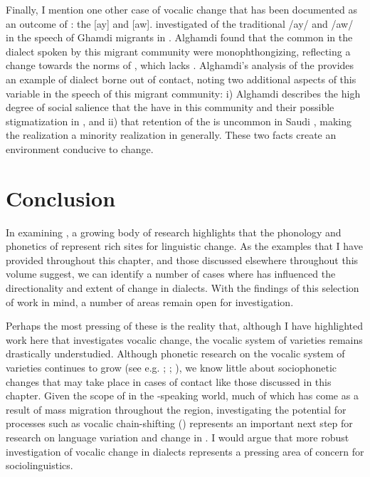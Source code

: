 \documentclass[output=paper]{langsci/langscibook}
\begin{document}
  Finally, I mention one other case of vocalic change that has been documented as an outcome of : the  [ay] and [aw]. \citet{Alghamdi2014} investigated  of the traditional   /ay/ and /aw/ in the speech of {Ghamdi} migrants in . Alghamdi found that the  common in the dialect spoken by this migrant community were monophthongizing, reflecting a change towards the norms of  , which lacks . Alghamdi’s analysis of the  provides an example of dialect  borne out of contact, noting two additional aspects of this variable in the speech of this migrant community: i) Alghamdi describes the high degree of social salience that the  have in this community and their possible stigmatization in , and ii) that retention of the  is uncommon in Saudi , making the  realization a minority realization in  generally. These two facts create an environment conducive to change.

\section{Conclusion}

In examining  , a growing body of research highlights that the phonology and phonetics of  represent rich sites for linguistic change. As the examples that I have provided throughout this chapter, and those discussed elsewhere throughout this volume suggest, we can identify a number of cases where  has influenced the directionality and extent of change in  dialects. With the findings of this selection of work in mind, a number of areas remain open for  investigation. 

  Perhaps the most pressing of these is the reality that, although I have highlighted work here that investigates vocalic change, the vocalic system of  varieties remains drastically understudied. Although phonetic research on the vocalic system of  varieties continues to grow (see e.g. \citealt{HassanHeselwood2011}; \citealt{KhattabAl-Tamimi2014}; \citealt{Al-TamimiKhattab2015}), we know little about sociophonetic changes that may take place in cases of contact like those discussed in this chapter. Given the scope of  in the -speaking world, much of which has come as a result of mass migration throughout the region, investigating the potential for processes such as vocalic chain-shifting (\citealt{Al-Wer2007}) represents an important next step for research on language variation and change in . I would argue that more robust investigation of vocalic change in  dialects represents a pressing area of concern for  sociolinguistics. 
\end{document}
